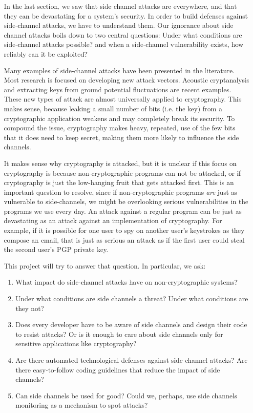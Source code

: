 \documentclass{acm_proc_article-sp}
\begin{document}
In the last section, we saw that side channel attacks are everywhere, and that
they can be devastating for a system's security. In order to build defenses
against side-channel attacks, we have to understand them. Our ignorance about
side channel attacks boils down to two central questions: Under what conditions
are side-channel attacks possible? and when a side-channel vulnerability exists,
how reliably can it be exploited?

Many examples of side-channel attacks have been presented in the literature.
Most research is focused on developing new attack vectors. Acoustic
cryptanalysis \cite{genkin2013rsa} and extracting keys from ground potential
fluctuations \cite{genkin2014get} are recent examples. These new types of attack
are almost universally applied to cryptography. This makes sense, because
leaking a small number of bits (i.e. the key) from a cryptographic application
weakens and may completely break its security. To compound the issue,
cryptography makes heavy, repeated, use of the few bits that it does need to
keep secret, making them more likely to influence the side channels.

It makes sense why cryptography is attacked, but it is unclear if this focus on
cryptography is because non-cryptographic programs can not be attacked, or if
cryptography is just the low-hanging fruit that gets attacked first. This is an
important question to resolve, since if non-cryptographic programs \emph{are}
just as vulnerable to side-channels, we might be overlooking serious
vulnerabilities in the programs we use every day. An attack against a regular
program can be just as devastating as an attack against an implementation of
cryptography. For example, if it is possible for one user to spy on another
user's keystrokes as they compose an email, that is just as serious an attack as
if the first user could steal the second user's PGP private key.

This project will try to answer that question. In particular, we ask:

\begin{enumerate}
\item What impact do side-channel attacks have on non-cryptographic systems?

\item Under what conditions are side channels a threat? Under what conditions
      are they not?

\item Does every developer have to be aware of side channels and design their
      code to resist attacks? Or is it enough to care about side channels only
      for sensitive applications like cryptography?

\item Are there automated technological defenses against side-channel attacks?
      Are there easy-to-follow coding guidelines that reduce the impact of side
      channels?

\item Can side channels be used for good? Could we, perhaps, use side channels
      monitoring as a mechanism to spot attacks?
\end{enumerate}
\end{document}
